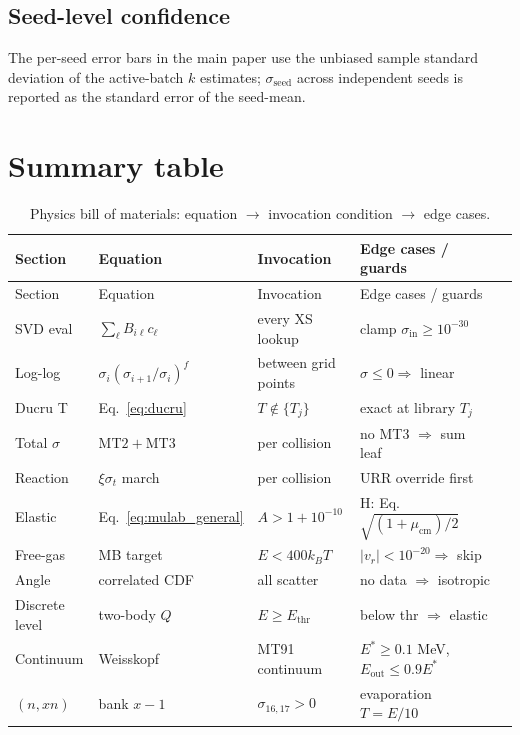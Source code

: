 \documentclass[11pt,a4paper]{article}
\begin{document}
\subsection{Seed-level confidence}

The per-seed error bars in the main paper use the unbiased
sample standard deviation of the active-batch $k$ estimates;
$\sigma_\text{seed}$ across independent seeds is reported
as the standard error of the seed-mean.

\section{Summary table}

\begin{longtable}{@{}lllll@{}}
\caption{Physics bill of materials: equation $\to$ invocation
condition $\to$ edge cases.} \label{tab:bom}\\
\toprule
Section & Equation & Invocation & Edge cases / guards \\
\midrule
\endfirsthead
\toprule
Section & Equation & Invocation & Edge cases / guards \\
\midrule
\endhead
SVD eval & $\sum_\ell B_{i\ell} c_\ell$ & every XS lookup & clamp $\sigma_\text{in} \geq 10^{-30}$ \\
Log-log & $\sigma_i(\sigma_{i+1}/\sigma_i)^f$ & between grid points & $\sigma \leq 0 \Rightarrow$ linear \\
Ducru T & Eq.~\eqref{eq:ducru} & $T \notin \{T_j\}$ & exact at library $T_j$ \\
Total $\sigma$ & $\mathrm{MT}2 + \mathrm{MT}3$ & per collision & no MT3 $\Rightarrow$ sum leaf \\
Reaction & $\xi\sigma_t$ march & per collision & URR override first \\
Elastic & Eq.~\eqref{eq:mulab_general} & $A > 1+10^{-10}$ & H: Eq.~$\sqrt{(1+\mu_\mathrm{cm})/2}$ \\
Free-gas & MB target & $E < 400 k_B T$ & $|v_r| < 10^{-20} \Rightarrow$ skip \\
Angle & correlated CDF & all scatter & no data $\Rightarrow$ isotropic \\
Discrete level & two-body $Q$ & $E \geq E_\mathrm{thr}$ & below thr $\Rightarrow$ elastic \\
Continuum & Weisskopf & MT91 continuum & $E^* \geq 0.1$ MeV, $E_\mathrm{out} \leq 0.9 E^*$ \\
$(n,xn)$ & bank $x-1$ & $\sigma_{16,17} > 0$ & evaporation $T = E/10$ \\

\end{longtable}
\end{document}
